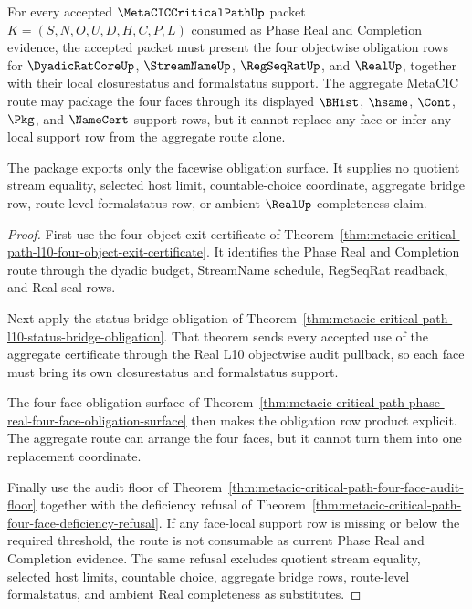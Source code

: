 \begin{theorem}
\label{thm:metacic-critical-path-l10-four-face-obligation-closure-package}
For every accepted $\MetaCICCriticalPathUp$ packet $K=(S,N,O,U,D,H,C,P,L)$ consumed as Phase Real and Completion evidence, the accepted packet must present the four objectwise obligation rows for $\DyadicRatCoreUp$, $\StreamNameUp$, $\RegSeqRatUp$, and $\RealUp$, together with their local closurestatus and formalstatus support. The aggregate MetaCIC route may package the four faces through its displayed $\BHist$, $\hsame$, $\Cont$, $\Pkg$, and $\NameCert$ support rows, but it cannot replace any face or infer any local support row from the aggregate route alone.

The package exports only the facewise obligation surface. It supplies no quotient stream equality, selected host limit, countable-choice coordinate, aggregate bridge row, route-level formalstatus row, or ambient $\RealUp$ completeness claim.
\end{theorem}
\begin{proof}
First use the four-object exit certificate of Theorem~\ref{thm:metacic-critical-path-l10-four-object-exit-certificate}. It identifies the Phase Real and Completion route through the dyadic budget, StreamName schedule, RegSeqRat readback, and Real seal rows.

Next apply the status bridge obligation of Theorem~\ref{thm:metacic-critical-path-l10-status-bridge-obligation}. That theorem sends every accepted use of the aggregate certificate through the Real L10 objectwise audit pullback, so each face must bring its own closurestatus and formalstatus support.

The four-face obligation surface of Theorem~\ref{thm:metacic-critical-path-phase-real-four-face-obligation-surface} then makes the obligation row product explicit. The aggregate route can arrange the four faces, but it cannot turn them into one replacement coordinate.

Finally use the audit floor of Theorem~\ref{thm:metacic-critical-path-four-face-audit-floor} together with the deficiency refusal of Theorem~\ref{thm:metacic-critical-path-four-face-deficiency-refusal}. If any face-local support row is missing or below the required threshold, the route is not consumable as current Phase Real and Completion evidence. The same refusal excludes quotient stream equality, selected host limits, countable choice, aggregate bridge rows, route-level formalstatus, and ambient Real completeness as substitutes.
\end{proof}

